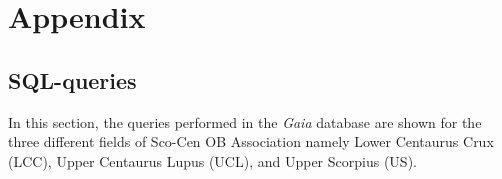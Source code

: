 \chapter{ \textbf{Appendix} }\label{ch:Appendix}
\vspace{0.5cm} 

\section{SQL-queries}\label{sec:SQL}
\lstset{language = SQL}

In this section, the queries performed in the \textit{Gaia} database are shown for the three different fields of Sco-Cen OB Association namely Lower Centaurus Crux (LCC), Upper Centaurus Lupus (UCL), and Upper Scorpius (US).\\    

